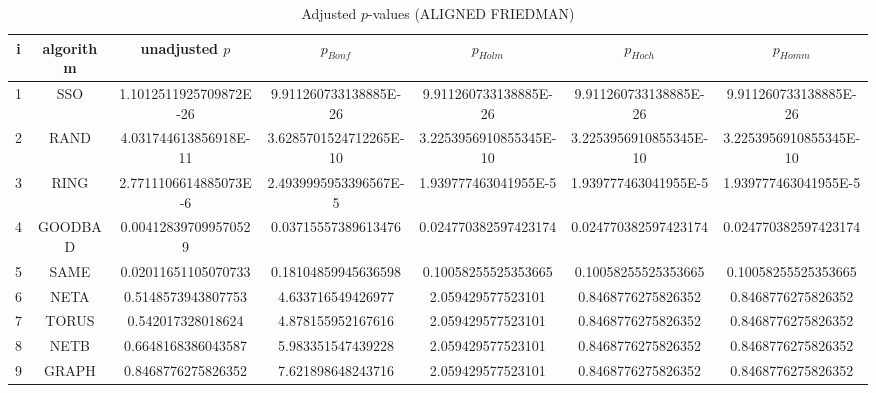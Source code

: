 \documentclass[a4paper,10pt]{article}
\begin{document}
\begin{landscape}
\begin{table}[!htp]
\centering\scriptsize
\caption{Adjusted $p$-values (ALIGNED FRIEDMAN)}
\begin{tabular}{ccccccc}
i&algorithm&unadjusted $p$&$p_{Bonf}$&$p_{Holm}$&$p_{Hoch}$&$p_{Homm}$\\
\hline
1& SSO&1.1012511925709872E-26&9.911260733138885E-26&9.911260733138885E-26&9.911260733138885E-26&9.911260733138885E-26\\
2& RAND&4.031744613856918E-11&3.6285701524712265E-10&3.2253956910855345E-10&3.2253956910855345E-10&3.2253956910855345E-10\\
3& RING&2.7711106614885073E-6&2.4939995953396567E-5&1.939777463041955E-5&1.939777463041955E-5&1.939777463041955E-5\\
4& GOODBAD&0.004128397099570529&0.03715557389613476&0.024770382597423174&0.024770382597423174&0.024770382597423174\\
5& SAME&0.02011651105070733&0.18104859945636598&0.10058255525353665&0.10058255525353665&0.10058255525353665\\
6& NETA&0.5148573943807753&4.633716549426977&2.059429577523101&0.8468776275826352&0.8468776275826352\\
7& TORUS&0.542017328018624&4.878155952167616&2.059429577523101&0.8468776275826352&0.8468776275826352\\
8& NETB&0.6648168386043587&5.983351547439228&2.059429577523101&0.8468776275826352&0.8468776275826352\\
9& GRAPH&0.8468776275826352&7.621898648243716&2.059429577523101&0.8468776275826352&0.8468776275826352\\
\hline
\end{tabular}
\end{table}


\end{landscape}
\end{document}
